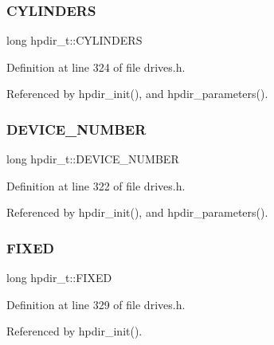 \subsubsection{\texorpdfstring{C\+Y\+L\+I\+N\+D\+E\+RS}{CYLINDERS}}
{\footnotesize\ttfamily long hpdir\+\_\+t\+::\+C\+Y\+L\+I\+N\+D\+E\+RS}



Definition at line 324 of file drives.\+h.



Referenced by hpdir\+\_\+init(), and hpdir\+\_\+parameters().

\mbox{\label{structhpdir__t_a3e761e4a98a5fdbd789ebf89c50b805f}} 
\subsubsection{\texorpdfstring{D\+E\+V\+I\+C\+E\+\_\+\+N\+U\+M\+B\+ER}{DEVICE\_NUMBER}}
{\footnotesize\ttfamily long hpdir\+\_\+t\+::\+D\+E\+V\+I\+C\+E\+\_\+\+N\+U\+M\+B\+ER}



Definition at line 322 of file drives.\+h.



Referenced by hpdir\+\_\+init(), and hpdir\+\_\+parameters().

\mbox{\label{structhpdir__t_a69855da74bcc15b10039a51e3680a994}} 
\subsubsection{\texorpdfstring{F\+I\+X\+ED}{FIXED}}
{\footnotesize\ttfamily long hpdir\+\_\+t\+::\+F\+I\+X\+ED}



Definition at line 329 of file drives.\+h.



Referenced by hpdir\+\_\+init().

\mbox{\label{structhpdir__t_a0b636f508776a07e2aaba4704dc124f2}} 
